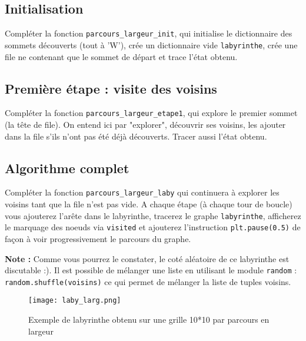 \subsection*{Initialisation}
\begin{question}
Compléter la fonction \texttt{parcours\_largeur\_init}, qui initialise le dictionnaire des sommets découverts (tout à 'W'), crée un dictionnaire vide \texttt{labyrinthe}, crée une file ne contenant que le sommet de départ et trace l'état obtenu.
\end{question}


\subsection*{Première étape : visite des voisins}
\begin{question}
Compléter la fonction \texttt{parcours\_largeur\_etape1}, qui explore le premier sommet (la tête de file). On entend ici par "explorer", découvrir ses voisins, les ajouter dans la file s'ils n'ont pas été déjà découverts. Tracer aussi l'état obtenu. 
\end{question}

\subsection*{Algorithme complet}
\begin{question}
Compléter la fonction \texttt{parcours\_largeur\_laby} qui continuera à explorer les voisins tant que la file n'est pas vide. A chaque étape (à chaque tour de boucle) vous ajouterez l'arête dans le labyrinthe, tracerez le graphe \texttt{labyrinthe}, afficherez le marquage des noeuds via \texttt{visited} et ajouterez l'instruction \texttt{plt.pause(0.5)} de façon à voir progressivement le parcours du graphe.
\end{question}

\textbf{Note :} Comme vous pourrez le constater, le coté aléatoire de ce labyrinthe est discutable :). Il est possible de mélanger une liste en utilisant le module \texttt{random} : \texttt{random.shuffle(voisins)} ce qui permet de mélanger la liste de tuples voisins.


\begin{figure}[!h]\centering
\texttt{[image: laby\_larg.png]}
\vspace{-0.7cm}
\caption{Exemple de labyrinthe obtenu sur une grille 10*10 par parcours en largeur}

\end{figure}

